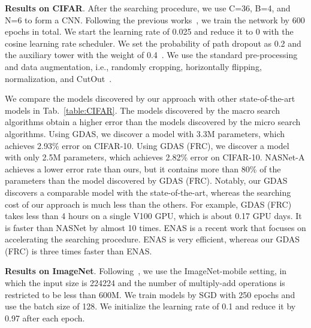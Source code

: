 \documentclass[10pt,twocolumn,letterpaper]{article}
\def\Tabref#1{Tab.~\ref{#1}}
\begin{document}
\textbf{Results on CIFAR}.
After the searching procedure, we use C=36, B=4, and N=6 to form a CNN.
Following the previous works~\cite{liu2019darts,pmlr-v80-pham18a,Zoph_2018_CVPR}, we train the network by 600 epochs in total. We start the learning rate of 0.025 and reduce it to 0 with the cosine learning rate scheduler.
We set the probability of path dropout as 0.2 and the auxiliary tower with the weight of 0.4~\cite{zoph2017NAS}.
We use the standard pre-processing and data augmentation, i.e., randomly cropping, horizontally flipping, normalization, and CutOut~\cite{CUTOUT,zhong2017random}.





We compare the models discovered by our approach with other state-of-the-art models in \Tabref{table:CIFAR}.
The models discovered by the macro search algorithms obtain a higher error than the models discovered by the micro search algorithms.
Using GDAS, we discover a model with 3.3M parameters, which achieves 2.93\% error on CIFAR-10.
Using GDAS (FRC), we discover a model with only 2.5M parameters, which achieves 2.82\% error on CIFAR-10.
NASNet-A achieves a lower error rate than ours, but it contains more than 80\% of the parameters than the model discovered by GDAS (FRC).
Notably, our GDAS discovers a comparable model with the state-of-the-art, whereas the searching cost of our approach is much less than the others.
For example, GDAS (FRC) takes less than 4 hours on a single V100 GPU, which is about 0.17 GPU days.
It is faster than NASNet by almost 10 times.
ENAS is a recent work that focuses on accelerating the searching procedure.
ENAS is very efficient, whereas our GDAS (FRC) is three times faster than ENAS.






\textbf{Results on ImageNet}.
Following~\cite{Zoph_2018_CVPR,liu2019darts,pmlr-v80-pham18a,sandler2018mobilenetv2}, we use the ImageNet-mobile setting, in which the input size is 224224 and the number of multiply-add operations is restricted to be less than 600M.
We train models by SGD with 250 epochs and use the batch size of 128.
We initialize the learning rate of 0.1 and reduce it by 0.97 after each epoch.
\end{document}
